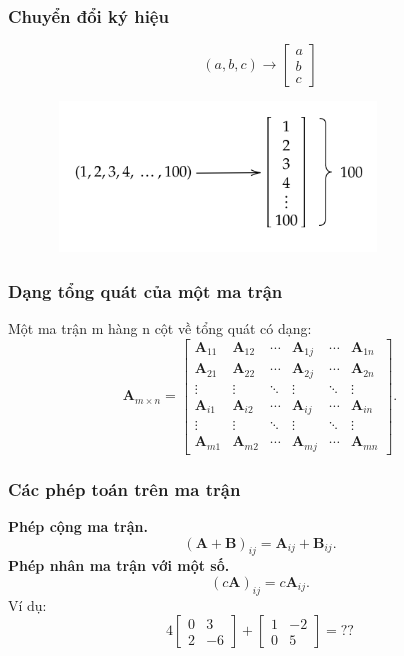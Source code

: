 \begin{frame}
    \frametitle{Chuyển đổi ký hiệu}
    \[(a,b,c)\rightarrow \begin{bmatrix}
    a\\b\\c
\end{bmatrix}\]
\begin{figure}[H]
    \centering
    \includegraphics[width=9cm, height=4cm]{Slides/Figure/array100.png}
\end{figure}
\end{frame}
\begin{frame}
    \frametitle{Dạng tổng quát của một ma trận}
    Một ma trận m hàng n cột về tổng quát có dạng:
    \[\mathbf{A}_{m\times n}=\begin{bmatrix}
    \mathbf{A}_{11} &   \mathbf{A}_{12} &\cdots &\mathbf{A}_{1j} &\cdots      & \mathbf{A}_{1n}\\  
    \mathbf{A}_{21} &   \mathbf{A}_{22} &\cdots &\mathbf{A}_{2j} &\cdots      & \mathbf{A}_{2n}\\
    \vdots          &   \vdots          &\ddots &\vdots          &\ddots      & \vdots         \\
    \mathbf{A}_{i1} &   \mathbf{A}_{i2} &\cdots &\mathbf{A}_{ij} &\cdots      & \mathbf{A}_{in}\\
    \vdots          &   \vdots          &\ddots &\vdots          &\ddots      &\vdots          \\
    \mathbf{A}_{m1} &   \mathbf{A}_{m2} &\cdots &\mathbf{A}_{mj} &\cdots      & \mathbf{A}_{mn}              
\end{bmatrix}.\]
\end{frame}
\begin{frame}
    \frametitle{Các phép toán trên ma trận}
    \textbf{Phép cộng ma trận.} \[(\mathbf{A}+\mathbf{B})_{ij}=\mathbf{A}_{ij}+\mathbf{B}_{ij}.\]
    \textbf{Phép nhân ma trận với một số.}\[(c\mathbf{A})_{ij}=c\mathbf{A}_{ij}.\]
    Ví dụ: \[4\begin{bmatrix}
    0&3\\ 2&-6
\end{bmatrix}+\begin{bmatrix}
    1&-2\\ 0&5
\end{bmatrix}=??\]
\end{frame}

